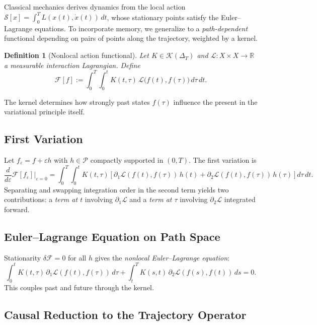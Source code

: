 \documentclass[12pt]{article}
\newtheorem{definition}[theorem]{Definition}
\newcommand{\R}{\mathbb{R}}
\newcommand{\Pcal}{\mathcal{P}}
\newcommand{\Kcal}{\mathcal{K}}
\begin{document}
Classical mechanics derives dynamics from the local action
$\mathcal{S}[x] = \int_0^T L(x(t),\dot{x}(t))\,dt$,
whose stationary points satisfy the Euler--Lagrange equations. To
incorporate memory, we generalize to a \emph{path-dependent} functional
depending on pairs of points along the trajectory, weighted by a kernel.

\begin{definition}[Nonlocal action functional]
Let $K \in \Kcal(\Delta_T)$ and $\mathcal{L} \colon X \times X \to \R$
a measurable interaction Lagrangian. Define
\[
  \mathcal{F}[f]
  :=
  \int_0^T \int_0^t
  K(t,\tau)\,\mathcal{L}\bigl(f(t), f(\tau)\bigr)\,d\tau\,dt.
\]
\end{definition}

The kernel determines how strongly past states $f(\tau)$ influence the
present in the variational principle itself.

\subsection{First Variation}

Let $f_\varepsilon = f + \varepsilon h$ with $h \in \Pcal$ compactly
supported in $(0,T)$. The first variation is
\[
  \frac{d}{d\varepsilon}\mathcal{F}[f_\varepsilon]\Big|_{\varepsilon=0}
  =
  \int_0^T\!\int_0^t K(t,\tau)\!\left[
    \partial_1\mathcal{L}(f(t),f(\tau))\,h(t)
    +\partial_2\mathcal{L}(f(t),f(\tau))\,h(\tau)
  \right]d\tau\,dt.
\]
Separating and swapping integration order in the second term yields two
contributions: a \emph{term at $t$} involving $\partial_1\mathcal{L}$ and
a \emph{term at $\tau$} involving $\partial_2\mathcal{L}$ integrated forward.

\subsection{Euler--Lagrange Equation on Path Space}

Stationarity $\delta\mathcal{F}=0$ for all $h$ gives the
\emph{nonlocal Euler--Lagrange equation}:
\begin{equation}
\label{eq:nonlocalEL}
  \int_0^t K(t,\tau)\,\partial_1\mathcal{L}(f(t),f(\tau))\,d\tau
  +\int_t^T K(s,t)\,\partial_2\mathcal{L}(f(s),f(t))\,ds = 0.
\end{equation}
This couples past and future through the kernel.

\subsection{Causal Reduction to the Trajectory Operator}
\end{document}
